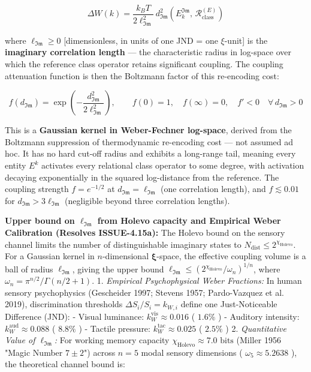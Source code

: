 \documentclass[11pt,a4paper]{article}
\theoremstyle{definition}
\theoremstyle{remark}
\begin{document}
\begin{equation}
\Delta W(k) = \frac{k_B T}{2\ell_{\mathfrak{Im}}^2}\, d_{\mathfrak{Im}}^2\!\left(E_k^{\mathfrak{Im}},\, \mathcal{R}_{\text{class}}^{(E)}\right)
\end{equation}


where $\ell_{\mathfrak{Im}} \geq 0$ [dimensionless, in units of one JND = one $\xi$-unit] is the \textbf{imaginary correlation length} — the characteristic radius in log-space over which the reference class operator retains significant coupling. The coupling attenuation function is then the Boltzmann factor of this re-encoding cost:


\begin{equation}
\boxed{f(d_{\mathfrak{Im}}) = \exp\!\left(-\frac{d_{\mathfrak{Im}}^2}{2\ell_{\mathfrak{Im}}^2}\right), \qquad f(0) = 1, \quad f(\infty) = 0, \quad f' < 0 \quad \forall\, d_{\mathfrak{Im}} > 0}
\end{equation}


This is a \textbf{Gaussian kernel in Weber-Fechner log-space}, derived from the Boltzmann suppression of thermodynamic re-encoding cost — not assumed ad hoc. It has no hard cut-off radius and exhibits a long-range tail, meaning every entity $E^k$ activates every relational class operator to some degree, with activation decaying exponentially in the squared log-distance from the reference. The coupling strength $f = e^{-1/2}$ at $d_{\mathfrak{Im}} = \ell_{\mathfrak{Im}}$ (one correlation length), and $f \lesssim 0.01$ for $d_{\mathfrak{Im}} > 3\ell_{\mathfrak{Im}}$ (negligible beyond three correlation lengths).

\textbf{Upper bound on $\ell_{\mathfrak{Im}}$ from Holevo capacity and Empirical Weber Calibration (Resolves ISSUE-4.15a):} The Holevo bound on the sensory channel limits the number of distinguishable imaginary states to $N_{\text{dist}} \leq 2^{\chi_{\text{Holevo}}}$. For a Gaussian kernel in $n$-dimensional $\boldsymbol{\xi}$-space, the effective coupling volume is a ball of radius $\ell_{\mathfrak{Im}}$, giving the upper bound $\ell_{\mathfrak{Im}} \leq (2^{\chi_{\text{Holevo}}}/\omega_n)^{1/n}$, where $\omega_n = \pi^{n/2}/\Gamma(n/2+1)$.
1. \textit{Empirical Psychophysical Weber Fractions:} In human sensory psychophysics (Gescheider 1997; Stevens 1957; Pardo-Vazquez et al. 2019), discrimination thresholds $\Delta S_i / S_i = k_{W,i}$ define one Just-Noticeable Difference (JND):
- Visual luminance: $k_W^{\text{vis}} \approx 0.016$ ( $1.6\%$ )
- Auditory intensity: $k_W^{\text{aud}} \approx 0.088$ ( $8.8\%$ )
- Tactile pressure: $k_W^{\text{tac}} \approx 0.025$ ( $2.5\%$ )
2. \textit{Quantitative Value of $\ell_{\mathfrak{Im}}$:} For working memory capacity $\chi_{\text{Holevo}} \approx 7.0\text{ bits}$ (Miller 1956 "Magic Number $7 \pm 2$") across $n = 5$ modal sensory dimensions ( $\omega_5 \approx 5.2638$ ), the theoretical channel bound is:
\end{document}
